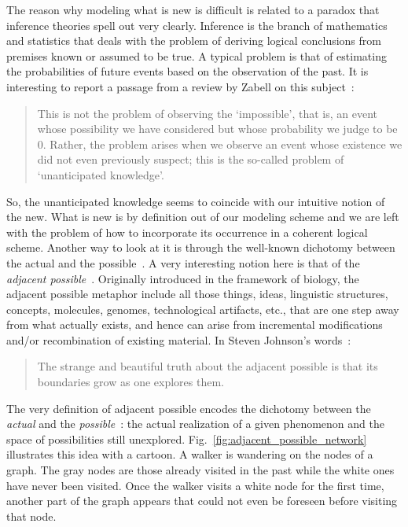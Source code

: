 \documentclass[graybox]{svmult}
\begin{document}
The reason why modeling what is new is difficult is related to a paradox that inference theories spell out very clearly. Inference is the branch of mathematics and statistics that deals with the problem of deriving logical conclusions from premises known or assumed to be true. A typical problem is that of estimating the probabilities of future events based on the observation of the past. It is interesting to report a passage from a review by Zabell on this subject~\cite{Zabell_1992}:
\begin{quote}
{ This is not the problem of observing the `impossible', that is, an event whose possibility we have considered but whose probability we judge to be $0$. Rather, the problem arises when we observe an event whose existence we did not even previously suspect; this is the so-called problem of `unanticipated knowledge'.}
\end{quote}
%
So, the unanticipated knowledge seems to coincide with our intuitive notion of the new. What is new is by definition out of our modeling scheme and we are left with the problem of how to incorporate its occurrence in a coherent logical scheme. Another way to look at it is through the well-known dichotomy between the actual and the possible~\cite{Jacob_1982}. A very interesting notion here is that of the {\em adjacent possible}~\cite{kauffman_1993,kauffman_2000}. Originally introduced in the framework of biology, the adjacent possible metaphor include all those things, ideas, linguistic structures, concepts, molecules, genomes, technological artifacts, etc., that are one step away from what actually exists, and hence can arise from incremental modifications and/or recombination of existing material. In Steven Johnson's words~\cite{johnson_2010_book}: 
\begin{quote}
{The strange and beautiful truth about the adjacent possible is that its boundaries grow as one explores them.} 
\end{quote}
%
The very definition of adjacent possible encodes the dichotomy between the {\em actual} and the {\em possible}~\cite{Jacob_1982}: the actual realization of a given phenomenon and the space of possibilities still unexplored. Fig.~\ref{fig:adjacent_possible_network} illustrates this idea with a cartoon. A walker is wandering on the nodes of a graph. The gray nodes are those already visited in the past while the white ones have  never been visited. Once the walker visits a white node for the first time, another part of the graph appears that could not even be foreseen before visiting that node.
\end{document}
